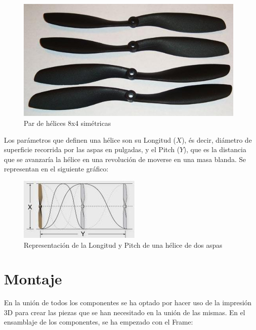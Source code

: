 \documentclass[twoside,11pt]{book}
\begin{document}
\begin{figure}[h!]
\begin{center}
\includegraphics[scale=0.65,bb=0 0 450 283]{images/propellers4.png}
\caption{Par de hélices 8x4 simétricas}
\end{center}
\end{figure}


Los parámetros que definen una hélice son su Longitud ($X$), és decir, diámetro de superficie recorrida por las aspas en pulgadas, y el Pitch ($Y$), que es la distancia que se avanzaría la hélice en una revolución de moverse en una masa blanda. Se representan en el siguiente gráfico:

\begin{figure}[h!]
\begin{center}
\includegraphics[scale=0.9,bb=0 0 244 115]{images/propeller_xy.png}
\caption{Representación de la Longitud y Pitch de una hélice de dos aspas}
\end{center}
\end{figure} 

\newpage
\section{Montaje}

En la unión de todos los componentes se ha optado por hacer uso de la impresión 3D para crear las piezas que se han necesitado en la unión de las mismas. En el ensamblaje de los componentes, se ha empezado con el Frame: \\
\end{document}

